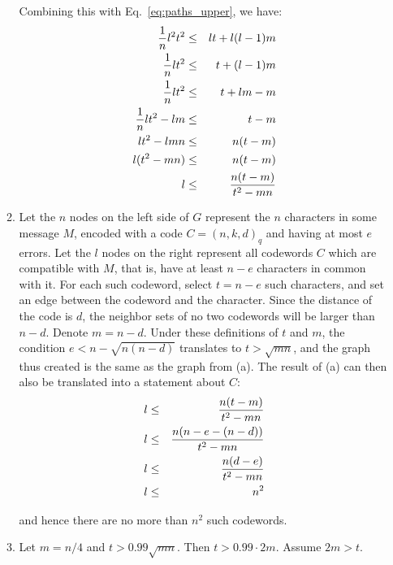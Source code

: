 \documentclass[11pt]{article} \usepackage{amssymb}
\begin{document}
\begin{enumerate}
\begin{enumerate}
    Combining this with Eq.~\ref{eq:paths_upper}, we have:
    \begin{eqnarray*}
      {1\over n}l^2t^2 &\leq& lt+l(l-1)m
      \\ {1\over n}lt^2 &\leq& t+(l-1)m
      \\ {1\over n}lt^2 &\leq& t+lm-m
      \\ {1\over n}lt^2 -lm &\leq& t-m
      \\ lt^2 - lmn &\leq& n(t-m)
      \\ l(t^2 - mn) &\leq& n(t-m)
      \\ l &\leq& {n(t-m)\over t^2 - mn}
    \end{eqnarray*}
    \item
    Let the $n$ nodes on the left side of $G$ represent the $n$ characters 
    in some message $M$, encoded with a code $C=(n,k,d)_q$ and having at most
    $e$ errors.  Let the $l$ nodes on the right
    represent all codewords $C$ which are compatible with $M$, that is, have
    at least $n-e$ characters in common with it. For each such codeword,
    select $t=n-e$ such characters, and set an edge between the codeword and the
    character. Since the distance of the code is $d$, the neighbor sets of no
    two codewords will be larger than $n-d$. Denote $m=n-d$. Under these
    definitions of $t$ and $m$, the condition $e<n-\sqrt{n(n-d)}$ translates
    to $t>\sqrt{mn}$, and the graph thus created is the same as the graph
    from (a). The result of (a) can then also be translated into a statement
    about $C$:
    \begin{eqnarray*}
      l &\leq& {n(t-m)\over t^2 - mn}
      \\l &\leq& {n(n-e-(n-d))\over t^2 - mn}
      \\l &\leq& {n(d-e)\over t^2 - mn}
      \\l &\leq& n^2
    \end{eqnarray*}

    and hence there are no more than $n^2$ such codewords.

    \item
      Let $m=n/4$ and $t>0.99\sqrt{mn}$. Then $t>0.99\cdot 2m$. Assume $2m>t$.

    \end{enumerate}
\end{enumerate}
\end{document}
